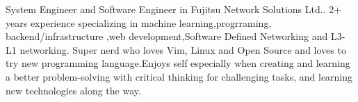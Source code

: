 

\begin{cvparagraph}

System Engineer and Software Engineer in Fujitsu Network Solutions Ltd.. 2+ years experience specializing in machine learning,progrraming, backend/infrastructure ,web development,Software Defined Networking and L3-L1 networking. Super nerd who loves Vim, Linux and Open Source and loves to try new programming language.Enjoys self especially when creating and learning a better problem-solving with critical thinking for challenging tasks, and learning new technologies along the way.
\end{cvparagraph}

